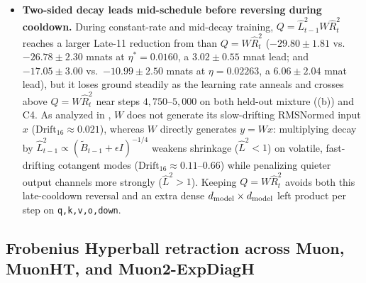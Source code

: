 \begin{itemize}
 \item \textbf{Two-sided decay leads mid-schedule before reversing during cooldown.} During constant-rate and mid-decay training, $Q=\hat L_{t-1}^2 W\hat R_t^2$ reaches a larger Late-11 reduction from  than $Q=W\hat R_t^2$ ($-29.80\pm1.81$ vs.\ $-26.78\pm2.30$ mnats at $\eta^*=0.0160$, a $3.02\pm0.55$ mnat lead; and $-17.05\pm3.00$ vs.\ $-10.99\pm2.50$ mnats at $\eta=0.02263$, a $6.06\pm2.04$ mnat lead), but it loses ground steadily as the learning rate anneals and crosses above $Q=W\hat R_t^2$ near steps $4{,}750\text{--}5{,}000$ on both held-out mixture ((b)) and C4. As analyzed in , $W$ does not generate its slow-drifting RMSNormed input $x$ ($\mathrm{Drift}_{16}\approx 0.021$), whereas $W$ directly generates $y=Wx$: multiplying decay by $\hat L_{t-1}^2\propto(\tilde B_{t-1}+\epsilon I)^{-1/4}$ weakens shrinkage ($\hat L^2<1$) on volatile, fast-drifting cotangent modes ($\mathrm{Drift}_{16}\approx 0.11\text{--}0.66$) while penalizing quieter output channels more strongly ($\hat L^2>1$). Keeping $Q=W\hat R_t^2$ avoids both this late-cooldown reversal and an extra dense $d_{\mathrm{model}}\times d_{\mathrm{model}}$ left product per step on \texttt{q,k,v,o,down}.
\end{itemize}

\subsection{Frobenius Hyperball retraction across Muon, MuonHT, and Muon2-ExpDiagH}
\label{sec:hyperball}

